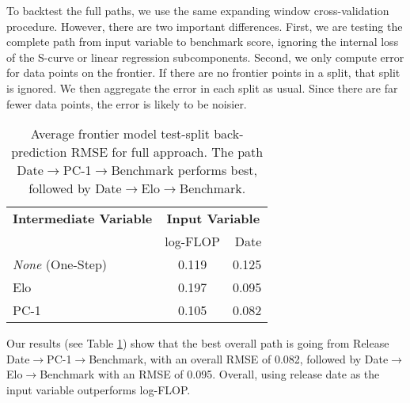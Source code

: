 To backtest the full paths, we use the same expanding window cross-validation procedure. 
However, there are two important differences. 
First, we are testing the complete path from input variable to benchmark score, ignoring the internal loss of the S-curve or linear regression subcomponents.
Second, we only compute error for data points on the frontier. If there are no frontier points in a split, that split is ignored.
We then aggregate the error in each split as usual. Since there are far fewer data points, the error is likely to be noisier.

\begin{table}[h]
   \begin{center}
       \begin{scriptsize}
           \setlength{\tabcolsep}{10pt}
           \begin{tabular}{l|cr}
                \toprule
                \textbf{Intermediate Variable} & \multicolumn{2}{c}{\textbf{Input Variable}}\\
                \cmidrule(r){1-1} \cmidrule(l){2-3}
                & log-FLOP & Date  \\
                \midrule
                \emph{None} (One-Step) &  0.119 & 0.125 \\
                Elo & 0.197 & 0.095 \\
                PC-1 & 0.105 & 0.082 \\
               \bottomrule
           \end{tabular}
       \end{scriptsize}
   \end{center}
   \vskip -0.1in
   \caption{Average frontier model test-split back-prediction RMSE for full approach. The path Date$\to$PC-1$\to$Benchmark performs best, followed by Date$\to$Elo$\to$Benchmark.}
   \label{table:rmse_paths}
\end{table}

Our results (see Table \ref{table:rmse_paths}) show that the best overall path is going from Release Date$\to$PC-1$\to$Benchmark, with an overall RMSE of 0.082, followed by Date$\to$Elo$\to$Benchmark with an RMSE of 0.095. Overall, using release date as the input variable outperforms log-FLOP.